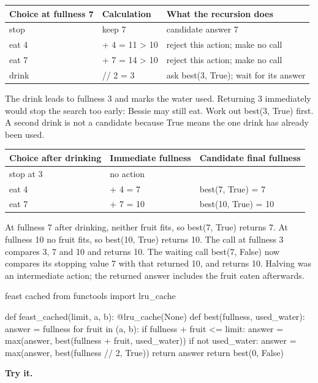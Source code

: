 \documentclass[11pt,a4paper,oneside]{report}
\begin{document}
\par\medskip\begingroup\small\setlength{\tabcolsep}{4pt}\renewcommand{\arraystretch}{1.3}\begin{tabularx}{\linewidth}{>{\raggedright\arraybackslash}X>{\raggedright\arraybackslash}X>{\raggedright\arraybackslash}X}\toprule\textbf{Choice at fullness 7} & \textbf{Calculation} & \textbf{What the recursion does}\\\midrule
{}stop & keep 7 & candidate answer 7\\
{}eat 4 & 7 + 4 = 11 > 10 & reject this action; make no call\\
{}eat 7 & 7 + 7 = 14 > 10 & reject this action; make no call\\
{}drink & 7 // 2 = 3 & ask best(3, True); wait for its answer\\
\bottomrule\end{tabularx}\endgroup\par\medskip
The drink leads to fullness 3 and marks the water used. Returning 3 immediately would stop the search too early: Bessie may still eat. Work out best(3, True) first. A second drink is not a candidate because True means the one drink has already been used.

\par\medskip\begingroup\small\setlength{\tabcolsep}{4pt}\renewcommand{\arraystretch}{1.3}\begin{tabularx}{\linewidth}{>{\raggedright\arraybackslash}X>{\raggedright\arraybackslash}X>{\raggedright\arraybackslash}X}\toprule\textbf{Choice after drinking} & \textbf{Immediate fullness} & \textbf{Candidate final fullness}\\\midrule
{}stop at 3 & no action & 3\\
{}eat 4 & 3 + 4 = 7 & best(7, True) = 7\\
{}eat 7 & 3 + 7 = 10 & best(10, True) = 10\\
\bottomrule\end{tabularx}\endgroup\par\medskip
At fullness 7 after drinking, neither fruit fits, so best(7, True) returns 7. At fullness 10 no fruit fits, so best(10, True) returns 10. The call at fullness 3 compares 3, 7 and 10 and returns 10. The waiting call best(7, False) now compares its stopping value 7 with that returned 10, and returns 10. Halving was an intermediate action; the returned answer includes the fruit eaten afterwards.

\begin{bookcode}{feast cached}
from functools import lru_cache

def feast_cached(limit, a, b):
    @lru_cache(None)
    def best(fullness, used_water):
        answer = fullness
        for fruit in (a, b):
            if fullness + fruit <= limit:
                answer = max(answer, best(fullness + fruit, used_water))
        if not used_water:
            answer = max(answer, best(fullness // 2, True))
        return answer
    return best(0, False)
\end{bookcode}
\textbf{Try it.}
\end{document}
